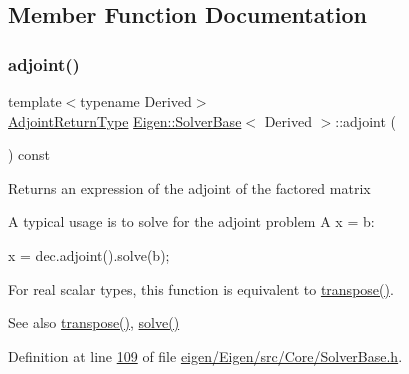 \subsection{Member Function Documentation}
\mbox{\label{class_eigen_1_1_solver_base_a05a3686a89888681c8e0c2bcab6d1ce5}} 
\subsubsection{\texorpdfstring{adjoint()}{adjoint()}\hspace{0.1cm}{\footnotesize\ttfamily [1/2]}}
{\footnotesize\ttfamily template$<$typename Derived$>$ \\
\hyperlink{class_eigen_1_1internal_1_1_tensor_lazy_evaluator_writable}{Adjoint\+Return\+Type} \hyperlink{class_eigen_1_1_solver_base}{Eigen\+::\+Solver\+Base}$<$ Derived $>$\+::adjoint (\begin{DoxyParamCaption}{ }\end{DoxyParamCaption}) const\hspace{0.3cm}{\ttfamily [inline]}}

\begin{DoxyReturn}{Returns}
an expression of the adjoint of the factored matrix
\end{DoxyReturn}
A typical usage is to solve for the adjoint problem A\textquotesingle{} x = b\+: 
\begin{DoxyCode}
x = dec.adjoint().solve(b); 
\end{DoxyCode}


For real scalar types, this function is equivalent to \hyperlink{class_eigen_1_1_solver_base_a732e75b5132bb4db3775916927b0e86c}{transpose()}.

\begin{DoxySeeAlso}{See also}
\hyperlink{class_eigen_1_1_solver_base_a732e75b5132bb4db3775916927b0e86c}{transpose()}, \hyperlink{class_eigen_1_1_solver_base_a7fd647d110487799205df6f99547879d}{solve()} 
\end{DoxySeeAlso}


Definition at line \hyperlink{eigen_2_eigen_2src_2_core_2_solver_base_8h_source_l00109}{109} of file \hyperlink{eigen_2_eigen_2src_2_core_2_solver_base_8h_source}{eigen/\+Eigen/src/\+Core/\+Solver\+Base.\+h}.

\mbox{\label{class_eigen_1_1_solver_base_a05a3686a89888681c8e0c2bcab6d1ce5}} 

